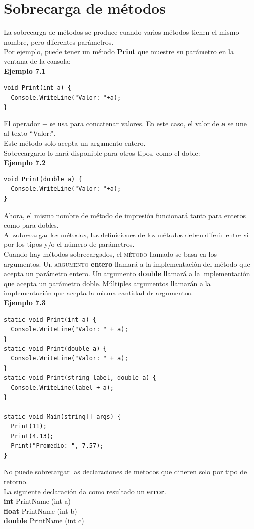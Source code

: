 \documentclass[12pt,a4paper]{report}
\begin{document}
\section{Sobrecarga de métodos}
La sobrecarga de métodos se produce cuando varios métodos tienen el mismo nombre, pero diferentes parámetros.\\Por ejemplo, puede tener un método \textbf{Print} que muestre su parámetro en la ventana de la consola:\\\textbf{Ejemplo 7.1}
\begin{lstlisting}
void Print(int a) {
  Console.WriteLine("Valor: "+a);
}
\end{lstlisting}El operador + se usa para concatenar valores. En este caso, el valor de\textbf{ a} se une al texto ``Valor:".\\Este método solo acepta un argumento entero.\\Sobrecargarlo lo hará disponible para otros tipos, como el doble:\\\textbf{Ejemplo 7.2}
\begin{lstlisting}
void Print(double a) {
  Console.WriteLine("Valor: "+a);
}
\end{lstlisting}Ahora, el mismo nombre de método de impresión funcionará tanto para enteros como para dobles.\\Al sobrecargar los métodos, las definiciones de los métodos deben diferir entre sí por los tipos y/o el número de parámetros.\\Cuando hay métodos sobrecargados, el\textsc{ método} llamado se basa en los argumentos. Un \textsc{ argumento} \textbf{entero} llamará a la implementación del método que acepta un parámetro entero. Un argumento \textbf{double} llamará a la implementación que acepta un parámetro doble. Múltiples argumentos llamarán a la implementación que acepta la misma cantidad de argumentos.\\\textbf{Ejemplo 7.3}
\begin{lstlisting}
static void Print(int a) {
  Console.WriteLine("Valor: " + a);
}
static void Print(double a) {
  Console.WriteLine("Valor: " + a);
}
static void Print(string label, double a) {
  Console.WriteLine(label + a);
}

static void Main(string[] args) {
  Print(11);
  Print(4.13);
  Print("Promedio: ", 7.57);
}
\end{lstlisting}No puede sobrecargar las declaraciones de métodos que difieren solo por tipo de retorno.\\La siguiente declaración da como resultado un\textbf{ error}.\\\textbf{int} PrintName (int a) {}
\\\textbf{float} PrintName (int b) {}
\\\textbf{double} PrintName (int c) {}
\end{document}
